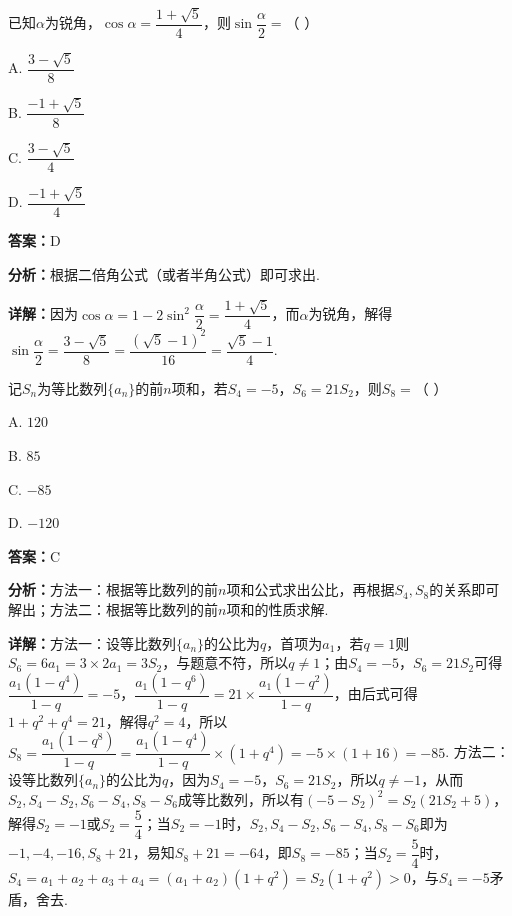 \begin{question}[points=5]
已知$\alpha$为锐角，$\cos\alpha=\dfrac{1+\sqrt{5}}{4}$，则$\sin\dfrac{\alpha}{2}=$（ \quad ）
\begin{choices}
  \item A. $\dfrac{3-\sqrt{5}}{8}$
  \item B. $\dfrac{-1+\sqrt{5}}{8}$
  \item C. $\dfrac{3-\sqrt{5}}{4}$
  \item D. $\dfrac{-1+\sqrt{5}}{4}$
\end{choices}
\begin{solution}
\textbf{答案：}D

\textbf{分析：}根据二倍角公式（或者半角公式）即可求出.

\textbf{详解：}因为$\cos\alpha=1-2\sin^{2}\dfrac{\alpha}{2}=\dfrac{1+\sqrt{5}}{4}$，而$\alpha$为锐角，解得$\sin\dfrac{\alpha}{2}=\dfrac{3-\sqrt{5}}{8}=\dfrac{(\sqrt{5}-1)^{2}}{16}=\dfrac{\sqrt{5}-1}{4}$.
\end{solution}
\end{question}

\begin{question}[points=5]
记$S_{n}$为等比数列$\{a_{n}\}$的前$n$项和，若$S_{4}=-5$，$S_{6}=21S_{2}$，则$S_{8}=$（ \quad ）
\begin{choices}
  \item A. $120$
  \item B. $85$
  \item C. $-85$
  \item D. $-120$
\end{choices}
\begin{solution}
\textbf{答案：}C

\textbf{分析：}方法一：根据等比数列的前$n$项和公式求出公比，再根据$S_{4},S_{8}$的关系即可解出；方法二：根据等比数列的前$n$项和的性质求解.

\textbf{详解：}方法一：设等比数列$\{a_{n}\}$的公比为$q$，首项为$a_{1}$，若$q=1$则$S_{6}=6a_{1}=3\times2a_{1}=3S_{2}$，与题意不符，所以$q\neq1$；由$S_{4}=-5$，$S_{6}=21S_{2}$可得$\dfrac{a_{1}(1-q^{4})}{1-q}=-5$，$\dfrac{a_{1}(1-q^{6})}{1-q}=21\times\dfrac{a_{1}(1-q^{2})}{1-q}$，由后式可得$1+q^{2}+q^{4}=21$，解得$q^{2}=4$，所以$S_{8}=\dfrac{a_{1}(1-q^{8})}{1-q}=\dfrac{a_{1}(1-q^{4})}{1-q}\times(1+q^{4})=-5\times(1+16)=-85$.
方法二：设等比数列$\{a_{n}\}$的公比为$q$，因为$S_{4}=-5$，$S_{6}=21S_{2}$，所以$q\neq-1$，从而$S_{2},S_{4}-S_{2},S_{6}-S_{4},S_{8}-S_{6}$成等比数列，所以有$(-5-S_{2})^{2}=S_{2}(21S_{2}+5)$，解得$S_{2}=-1$或$S_{2}=\dfrac{5}{4}$；当$S_{2}=-1$时，$S_{2},S_{4}-S_{2},S_{6}-S_{4},S_{8}-S_{6}$即为$-1,-4,-16,S_{8}+21$，易知$S_{8}+21=-64$，即$S_{8}=-85$；当$S_{2}=\dfrac{5}{4}$时，$S_{4}=a_{1}+a_{2}+a_{3}+a_{4}=(a_{1}+a_{2})(1+q^{2})=S_{2}(1+q^{2})>0$，与$S_{4}=-5$矛盾，舍去.
\end{solution}
\end{question}

